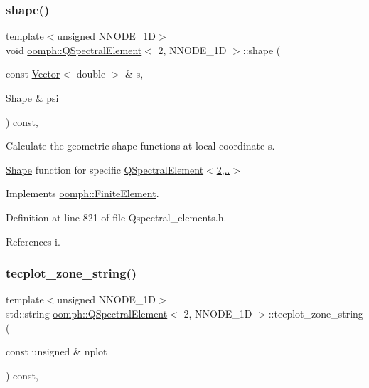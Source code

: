 \subsubsection{\texorpdfstring{shape()}{shape()}}
{\footnotesize\ttfamily template$<$unsigned N\+N\+O\+D\+E\+\_\+1D$>$ \\
void \hyperlink{classoomph_1_1QSpectralElement}{oomph\+::\+Q\+Spectral\+Element}$<$ 2, N\+N\+O\+D\+E\+\_\+1D $>$\+::shape (\begin{DoxyParamCaption}\item[{const \hyperlink{classoomph_1_1Vector}{Vector}$<$ double $>$ \&}]{s,  }\item[{\hyperlink{classoomph_1_1Shape}{Shape} \&}]{psi }\end{DoxyParamCaption}) const\hspace{0.3cm}{\ttfamily [inline]}, {\ttfamily [virtual]}}



Calculate the geometric shape functions at local coordinate s. 

\hyperlink{classoomph_1_1Shape}{Shape} function for specific \hyperlink{classoomph_1_1QSpectralElement_3_012_00_01NNODE__1D_01_4_a950e01a426602b45c67c19fdf0693583}{Q\+Spectral\+Element$<$2,..$>$} 

Implements \hyperlink{classoomph_1_1FiniteElement_a58a25b6859ddd43b7bfe64a19fee5023}{oomph\+::\+Finite\+Element}.



Definition at line 821 of file Qspectral\+\_\+elements.\+h.



References i.

\mbox{\label{classoomph_1_1QSpectralElement_3_012_00_01NNODE__1D_01_4_a3abd839fcc323136429275aedd414765}} 
\subsubsection{\texorpdfstring{tecplot\+\_\+zone\+\_\+string()}{tecplot\_zone\_string()}}
{\footnotesize\ttfamily template$<$unsigned N\+N\+O\+D\+E\+\_\+1D$>$ \\
std\+::string \hyperlink{classoomph_1_1QSpectralElement}{oomph\+::\+Q\+Spectral\+Element}$<$ 2, N\+N\+O\+D\+E\+\_\+1D $>$\+::tecplot\+\_\+zone\+\_\+string (\begin{DoxyParamCaption}\item[{const unsigned \&}]{nplot }\end{DoxyParamCaption}) const\hspace{0.3cm}{\ttfamily [inline]}, {\ttfamily [virtual]}}



